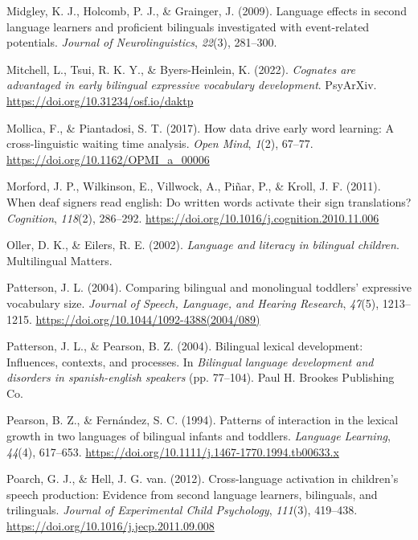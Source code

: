 \documentclass[
]{article}
\newlength{\cslhangindent}
\newlength{\cslentryspacingunit} %
\newenvironment{CSLReferences}[2] %
 {%
  \setlength{\parindent}{0pt}
  \ifodd #1
  \let\oldpar\par
  \def\par{\hangindent=\cslhangindent\oldpar}
  \fi
  \setlength{\parskip}{#2\cslentryspacingunit}
 }%
 {}
\begin{document}
\begin{CSLReferences}{1}{0}
\leavevmode{}%
Midgley, K. J., Holcomb, P. J., \& Grainger, J. (2009). Language effects
in second language learners and proficient bilinguals investigated with
event-related potentials. \emph{Journal of Neurolinguistics},
\emph{22}(3), 281--300.

\leavevmode{}%
Mitchell, L., Tsui, R. K. Y., \& Byers-Heinlein, K. (2022).
\emph{Cognates are advantaged in early bilingual expressive vocabulary
development}. {PsyArXiv}. \url{https://doi.org/10.31234/osf.io/daktp}

\leavevmode{}%
Mollica, F., \& Piantadosi, S. T. (2017). How data drive early word
learning: A cross-linguistic waiting time analysis. \emph{Open Mind},
\emph{1}(2), 67--77. \url{https://doi.org/10.1162/OPMI_a_00006}

\leavevmode{}%
Morford, J. P., Wilkinson, E., Villwock, A., Piñar, P., \& Kroll, J. F.
(2011). When deaf signers read english: Do written words activate their
sign translations? \emph{Cognition}, \emph{118}(2), 286--292.
\url{https://doi.org/10.1016/j.cognition.2010.11.006}

\leavevmode{}%
Oller, D. K., \& Eilers, R. E. (2002). \emph{Language and literacy in
bilingual children}. Multilingual Matters.

\leavevmode{}%
Patterson, J. L. (2004). Comparing bilingual and monolingual toddlers'
expressive vocabulary size. \emph{Journal of Speech, Language, and
Hearing Research}, \emph{47}(5), 1213--1215.
\url{https://doi.org/10.1044/1092-4388(2004/089)}

\leavevmode{}%
Patterson, J. L., \& Pearson, B. Z. (2004). Bilingual lexical
development: Influences, contexts, and processes. In \emph{Bilingual
language development and disorders in spanish-english speakers} (pp.
77--104). Paul H. Brookes Publishing Co.

\leavevmode{}%
Pearson, B. Z., \& Fernández, S. C. (1994). Patterns of interaction in
the lexical growth in two languages of bilingual infants and toddlers.
\emph{Language Learning}, \emph{44}(4), 617--653.
\url{https://doi.org/10.1111/j.1467-1770.1994.tb00633.x}

\leavevmode{}%
Poarch, G. J., \& Hell, J. G. van. (2012). Cross-language activation in
children's speech production: Evidence from second language learners,
bilinguals, and trilinguals. \emph{Journal of Experimental Child
Psychology}, \emph{111}(3), 419--438.
\url{https://doi.org/10.1016/j.jecp.2011.09.008}


\end{CSLReferences}
\end{document}
